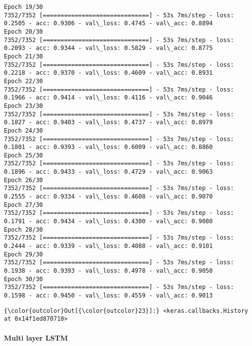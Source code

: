 \documentclass[11pt]{article}
\begin{document}
\begin{Verbatim}[commandchars=\\\{\}]
Epoch 19/30
7352/7352 [==============================] - 53s 7ms/step - loss: 0.2505 - acc: 0.9306 - val\_loss: 0.4745 - val\_acc: 0.8894
Epoch 20/30
7352/7352 [==============================] - 53s 7ms/step - loss: 0.2093 - acc: 0.9344 - val\_loss: 0.5829 - val\_acc: 0.8775
Epoch 21/30
7352/7352 [==============================] - 53s 7ms/step - loss: 0.2218 - acc: 0.9370 - val\_loss: 0.4609 - val\_acc: 0.8931
Epoch 22/30
7352/7352 [==============================] - 53s 7ms/step - loss: 0.1966 - acc: 0.9414 - val\_loss: 0.4116 - val\_acc: 0.9046
Epoch 23/30
7352/7352 [==============================] - 53s 7ms/step - loss: 0.1827 - acc: 0.9403 - val\_loss: 0.4737 - val\_acc: 0.8979
Epoch 24/30
7352/7352 [==============================] - 53s 7ms/step - loss: 0.1801 - acc: 0.9393 - val\_loss: 0.6009 - val\_acc: 0.8860
Epoch 25/30
7352/7352 [==============================] - 53s 7ms/step - loss: 0.1896 - acc: 0.9433 - val\_loss: 0.4729 - val\_acc: 0.9063
Epoch 26/30
7352/7352 [==============================] - 53s 7ms/step - loss: 0.2555 - acc: 0.9334 - val\_loss: 0.4608 - val\_acc: 0.9070
Epoch 27/30
7352/7352 [==============================] - 53s 7ms/step - loss: 0.1791 - acc: 0.9434 - val\_loss: 0.4300 - val\_acc: 0.9080
Epoch 28/30
7352/7352 [==============================] - 53s 7ms/step - loss: 0.2444 - acc: 0.9339 - val\_loss: 0.4088 - val\_acc: 0.9101
Epoch 29/30
7352/7352 [==============================] - 53s 7ms/step - loss: 0.1938 - acc: 0.9393 - val\_loss: 0.4978 - val\_acc: 0.9050
Epoch 30/30
7352/7352 [==============================] - 53s 7ms/step - loss: 0.1598 - acc: 0.9450 - val\_loss: 0.4559 - val\_acc: 0.9013

    \end{Verbatim}

\begin{Verbatim}[commandchars=\\\{\}]
{\color{outcolor}Out[{\color{outcolor}23}]:} <keras.callbacks.History at 0x14f1ed870710>
\end{Verbatim}
            
    \paragraph{Multi layer LSTM}\label{multi-layer-lstm}
\end{document}
